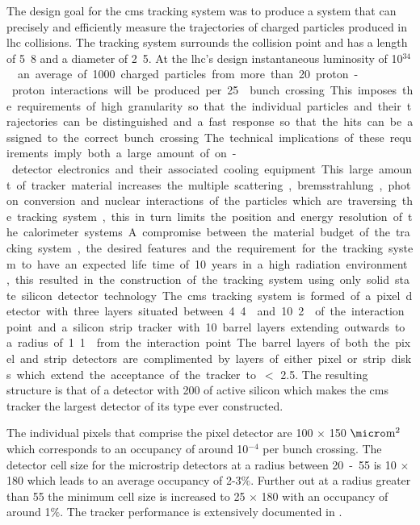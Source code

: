 The design goal for the \ac{cms} tracking system was to produce a system that 
can precisely and efficiently measure the trajectories of charged particles 
produced in \ac{lhc} collisions. The tracking system surrounds the collision 
point and has a length of \unit{5.8}{\meter} and a diameter of 
\unit{2.5}{\meter}. At the \ac{lhc}'s design instantaneous luminosity of 
\unit{10$^{34}$}{\lumiunits} an average of 1000 charged particles from more 
than 20 proton-proton interactions will be produced per \unit{25}{\nano\second} 
bunch crossing. This imposes the requirements of high granularity so that the 
individual particles and their trajectories can be distinguished and a fast 
response so that the hits can be assigned to the correct bunch crossing. The 
technical implications of these requirements imply both a large amount of 
on-detector electronics and their associated cooling equipment. This large 
amount of tracker material increases the multiple scattering, bremsstrahlung, 
photon conversion and nuclear interactions of the particles which are 
traversing the tracking system, this in turn limits the position and energy 
resolution of the calorimeter systems. A compromise between the material budget 
of the tracking system, the desired features and the requirement for the 
tracking system to have an expected life time of 10 years in a high radiation 
environment, this resulted in the construction of the tracking system using only solid state
silicon detector technology.

The \ac{cms} tracking system is formed of a pixel detector with three layers 
situated between \unit{4.4}{\cm} and \unit{10.2}{\cm} of the interaction point 
and a silicon strip tracker with 10 barrel layers extending outwards to a 
radius of \unit{1.1}{\meter} from the interaction point. The barrel layers of 
both the pixel and strip detectors are complimented by layers of either pixel 
or strip disks which extend the acceptance of the tracker to \mETA $<$ 2.5. The 
resulting structure is that of a detector with \unit{200}{\squaremetre} of 
active silicon which makes the \ac{cms} tracker the largest detector of its 
type ever constructed.

The individual pixels that comprise the pixel detector are 100 $\times$ 
150 $\micro\textrm{m}^{2}$ which corresponds to an occupancy of around 
10$^{-4}$ per bunch crossing. The detector cell size for the microstrip 
detectors at a radius between \unit{20-55}{\cm} is \unit{10}{\cm} $\times$ 
\unit{180}{\micro\meter} which leads to an average occupancy of 2-3$\%$. 
Further out at a radius greater than \unit{55}{\cm}  the minimum cell size is 
increased to \unit{25}{\cm} $\times$ \unit{180}{\micro\meter} with an occupancy 
of around 1$\%$. The tracker performance is extensively documented in 
\cite{cmstracking}.

